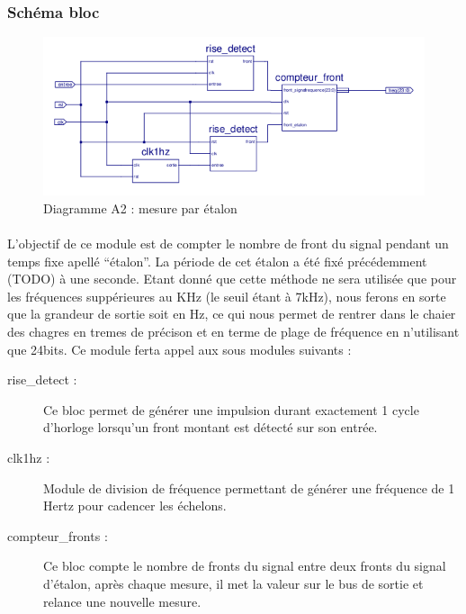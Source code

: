 \documentclass[a4paper,11pt]{article}
\begin{document}
  \subsubsection{Schéma bloc}
  
  \begin{figure}[H]
\begin{center}
	\includegraphics[scale=1]{sch-etalon.png}
	\caption{Diagramme A2 : mesure par étalon}
\end{center}
\end{figure}

\paragraph{} L'objectif de ce module est de compter le nombre de front du signal pendant un temps fixe apellé ``étalon''.
La période de cet étalon a été fixé précédemment (TODO) à une seconde. Etant donné que cette méthode ne sera utilisée que pour les 
fréquences suppérieures au KHz (le seuil étant à 7kHz), nous ferons en sorte que la grandeur de sortie soit en Hz, ce qui nous permet 
de rentrer dans le chaier des chagres en tremes de précison et en terme de plage de fréquence en n'utilisant que 24bits. Ce module 
ferta appel aux sous modules suivants :

\begin{description}
  \item[rise\_detect : ] Ce bloc permet de générer une impulsion durant exactement 1 cycle d'horloge lorsqu'un front montant est détecté
  sur son entrée.
  \item[clk1hz : ] Module de division de fréquence permettant de générer une fréquence de 1 Hertz pour cadencer les échelons.
  \item[compteur\_fronts : ] Ce bloc compte le nombre de fronts du signal entre deux fronts du signal d'étalon, après chaque mesure,
  il met la valeur sur le bus de sortie et relance une nouvelle mesure.
\end{description}
\end{document}
